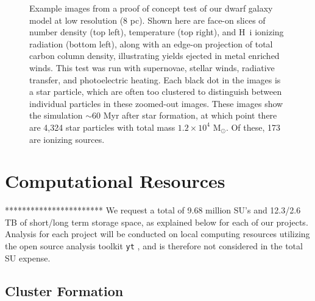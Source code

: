 \documentclass[11pt]{article}
\begin{document}
\begin{figure}
\caption{\small Example images from a proof of concept test of our dwarf galaxy model at low resolution (8 pc). Shown here are face-on slices of number density (top left), temperature (top right), and H~{\sc i} ionizing radiation (bottom left), along with an edge-on projection of total carbon column density, illustrating yields ejected in metal enriched winds. This test was run with supernovae, stellar winds, radiative transfer, and photoelectric heating. Each black dot in the images is a star particle, which are often too clustered to distinguish between individual particles in these zoomed-out images. These images show the simulation $\sim$60 Myr after star formation, at which point there are 4,324 star particles with total mass $1.2\times10^4$ M$_{\odot}$. Of these, 173 are ionizing sources.}
\label{fig:dwarf galaxy}
\end{figure}

\section{Computational Resources}
***********************
We request a total of 9.68 million SU's and 12.3/2.6 TB of short/long term storage space, as explained below for each of our projects. Analysis for each project will be conducted on local computing resources utilizing the open source analysis toolkit \texttt{yt} \citep{yt}, and is therefore not considered in the total SU expense.

\subsection{Cluster Formation}


\end{document}
